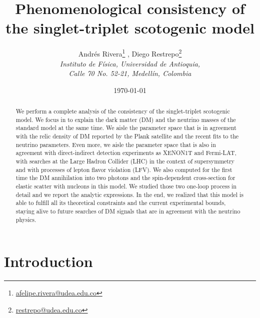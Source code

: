 \documentclass[12pt,letterpaper]{article}
\title{
Phenomenological consistency of the singlet-triplet scotogenic model
}
\author{ 
    Andrés Rivera\footnote{\href{mailto:afelipe.rivera@udea.edu.co}{afelipe.rivera@udea.edu.co}}
   , Diego Restrepo\footnote{\href{mailto:restrepo@udea.edu.co}{restrepo@udea.edu.co}}
    \\
\textit{\small  Instituto de F\'{i}sica, Universidad de Antioquia,} \\
\textit{\small  Calle 70 No. 52-21, Medell\'{i}n, Colombia}
}
\date{\small \today}
\begin{document}
\maketitle
\begin{abstract}
We perform a complete analysis of the consistency of the singlet-triplet scotogenic model. We focus in to explain the dark matter (DM) and the neutrino masses of the standard model at the same time.
We aisle the parameter space that is in agreement with the relic density of DM reported by the Plank satellite and the recent fits to the neutrino parameters. 
Even more, we aisle the parameter space that is also in agreement with direct-indirect detection experiments as XENON1T and Fermi-LAT, with searches at the Large Hadron Collider (LHC) in the context of supersymmetry and with processes of lepton flavor violation (LFV).
We also computed for the first time the DM annihilation into two photons and the spin-dependent cross-section for elastic scatter with nucleons in this model. We studied those two one-loop process in detail and we report the analytic expressions.
In the end, we realized that this model is able to fulfill all its theoretical constraints and the current experimental bounds, staying alive to future searches of DM signals that are in agreement with the neutrino physics. 
  

\end{abstract}



\section{Introduction}
\end{document}
